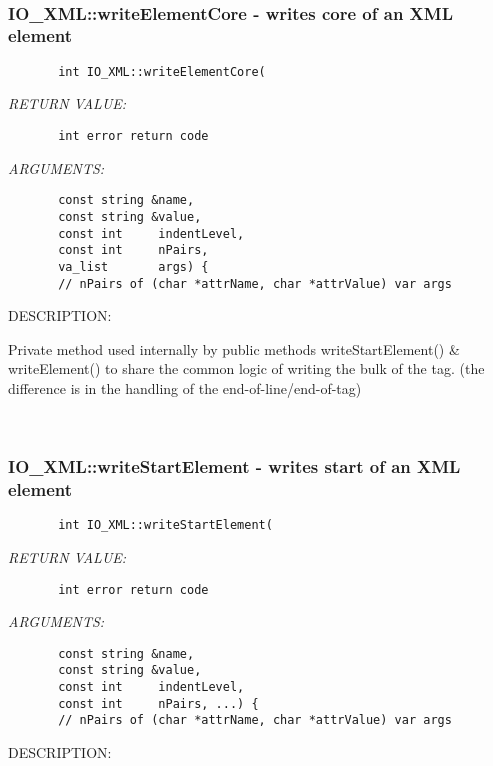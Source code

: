  
\mbox{}\hrulefill\
 
\subsubsection [IO\_XML::writeElementCore] {IO\_XML::writeElementCore - writes core of an XML element}


  
\begin{verbatim}       int IO_XML::writeElementCore(\end{verbatim}{\em RETURN VALUE:}
\begin{verbatim}       int error return code\end{verbatim}{\em ARGUMENTS:}
\begin{verbatim}       const string &name,
       const string &value,
       const int     indentLevel,
       const int     nPairs,
       va_list       args) {
       // nPairs of (char *attrName, char *attrValue) var args
 \end{verbatim}
{\sf DESCRIPTION:\\ }


     Private method used internally by public methods writeStartElement() &
     writeElement() to share the common logic of writing the bulk of the tag.
     (the difference is in the handling of the end-of-line/end-of-tag)
   
 
\mbox{}\hrulefill\ 
 
\subsubsection [IO\_XML::writeStartElement] {IO\_XML::writeStartElement - writes start of an XML element}


  
\begin{verbatim}       int IO_XML::writeStartElement(\end{verbatim}{\em RETURN VALUE:}
\begin{verbatim}       int error return code\end{verbatim}{\em ARGUMENTS:}
\begin{verbatim}       const string &name,
       const string &value,
       const int     indentLevel,
       const int     nPairs, ...) {
       // nPairs of (char *attrName, char *attrValue) var args
 \end{verbatim}
{\sf DESCRIPTION:\\ }


